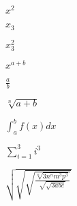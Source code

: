 \documentclass{article}
\begin{document}
$x^2$

$x_3$

$x^2_3$

$x^{a+b}$

$\frac{a}{b}$

$\sqrt[n]{a+b}$

$\int_a^b f(x)dx$

$\sum_{i=1}^{3} i^{3}$


$\sqrt{\sqrt{\sqrt{\frac{\sqrt[n]{3n^{n}m^{3}p^{3}}}{\sqrt{\sqrt{3abc}}}}}}$
\end{document}
